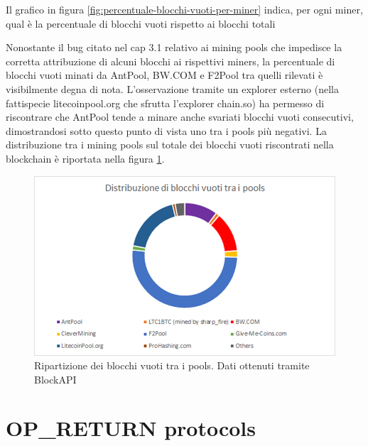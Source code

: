 Il grafico in figura \ref*{fig:percentuale-blocchi-vuoti-per-miner} indica, per ogni miner, qual è la percentuale di blocchi vuoti rispetto ai blocchi totali

Nonostante il bug citato nel cap 3.1 relativo ai mining pools che impedisce la corretta attribuzione di alcuni blocchi ai rispettivi miners, la percentuale di blocchi vuoti minati da AntPool, BW.COM e F2Pool tra quelli rilevati è visibilmente degna di nota. L’osservazione tramite un explorer esterno (nella fattispecie litecoinpool.org che sfrutta l'explorer chain.so) ha permesso di riscontrare che AntPool tende a minare anche svariati blocchi vuoti consecutivi, dimostrandosi sotto questo punto di vista uno tra i pools più negativi.
La distribuzione tra i mining pools sul totale dei blocchi vuoti riscontrati nella blockchain è riportata nella figura \ref{fig:distribuzione-blocchivuoti-ring}.

\begin{figure}[h!]
	\centering
	\includegraphics[width=1.0\linewidth]{images/distribuzione-blocchivuoti-ring}
	\caption{Ripartizione dei blocchi vuoti tra i pools. Dati ottenuti tramite BlockAPI}
	\label{fig:distribuzione-blocchivuoti-ring}
\end{figure}


\section{OP\_RETURN protocols}
